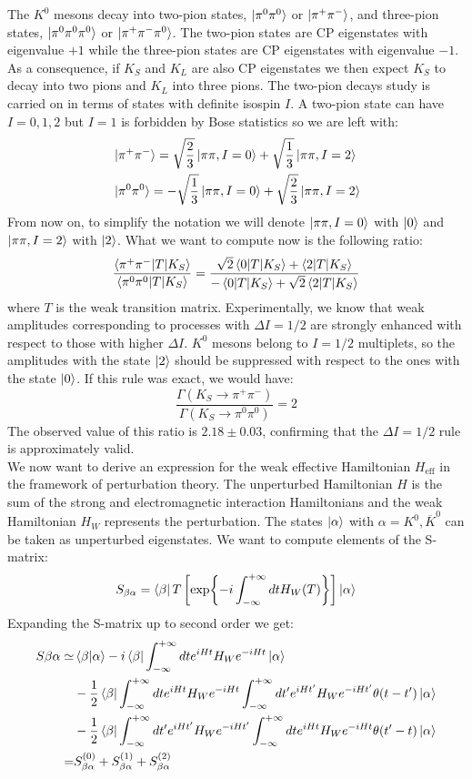 \documentclass[../main.tex]{subfiles}
\begin{document}
The $K^0$ mesons decay into two-pion states, $\ket{\pi^0\pi^0}$ or $\ket{\pi^+\pi^-}$, and three-pion states, $\ket{\pi^0\pi^0\pi^0}$ or $\ket{\pi^+\pi^-\pi^0}$. The two-pion states are CP eigenstates with eigenvalue $+1$ while the three-pion states are CP eigenstates with eigenvalue $-1$. As a consequence, if $K_S$ and $K_L$ are also CP eigenstates we then expect $K_S$ to decay into two pions and $K_L$ into three pions. The two-pion decays study is carried on in terms of states with definite isospin $I$. A two-pion state can have $I=0,1,2$  but $I=1$ is forbidden by Bose statistics so we are left with:
\[
\begin{aligned}
&\ket{\pi^+\pi^-}=\sqrt{\frac{2}{3}}\ket{\pi\pi,I=0}+\sqrt{\frac{1}{3}}\ket{\pi\pi,I=2}\\
&\ket{\pi^0\pi^0}=-\sqrt{\frac{1}{3}}\ket{\pi\pi,I=0}+\sqrt{\frac{2}{3}}\ket{\pi\pi,I=2}
\end{aligned}
\]
From now on, to simplify the notation we will denote $\ket{\pi\pi,I=0}$ with $\ket{0}$ and $\ket{\pi\pi,I=2}$ with $\ket{2}$. What we want to compute now is the following ratio:
\[
\frac{\braket{\pi^+\pi^-|T|K_S}}{\braket{\pi^0\pi^0|T|K_S}}=\frac{\sqrt{2}\braket{0|T|K_S}+\braket{2|T|K_S}}{-\braket{0|T|K_S}+\sqrt{2}\braket{2|T|K_S}}
\]
where $T$ is the weak transition matrix. Experimentally, we know that weak amplitudes corresponding to processes with $\Delta I=1/2$ are strongly enhanced with respect to those with higher $\Delta I$. $K^0$ mesons belong to $I=1/2$ multiplets, so the amplitudes with the state $\ket{2}$ should be suppressed with respect to the ones with the state $\ket{0}$. If this rule was exact, we would have:
\[
\frac{\Gamma(K_S\to\pi^+\pi^-)}{\Gamma(K_S\to\pi^0\pi^0)}=2
\]
The observed value of this ratio is $2.18\pm0.03$, confirming that the $\Delta I=1/2$ rule is approximately valid.\\ 
We now want to derive an expression for the weak effective Hamiltonian $H_{\text{eff}}$ in the framework of perturbation theory. The unperturbed Hamiltonian $H$ is the sum of the strong and electromagnetic interaction Hamiltonians and the weak Hamiltonian $H_W$ represents the perturbation. The states $\ket{\alpha}$ with $\alpha=K^0,\overline{K}^0$ can be taken as unperturbed eigenstates. We want to compute elements of the S-matrix:
\[
S_{\beta\alpha}=\bra{\beta}T\left[\exp{-i\int_{-\infty}^{+\infty}dtH_W(T)}\right]\ket{\alpha}
\]
Expanding the S-matrix up to second order we get:
\begin{align*}
S{\beta\alpha}\simeq&\braket{\beta|\alpha}-i\bra{\beta}\int_{-\infty}^{+\infty}dte^{iHt}H_We^{-iHt}\ket{\alpha}\\
&-\frac{1}{2}\bra{\beta}\int_{-\infty}^{+\infty}dte^{iHt}H_We^{-iHt}\int_{-\infty}^{+\infty}dt'e^{iHt'}H_We^{-iHt'}\theta(t-t')\ket{\alpha}\\
&-\frac{1}{2}\bra{\beta}\int_{-\infty}^{+\infty}dt'e^{iHt'}H_We^{-iHt'}\int_{-\infty}^{+\infty}dte^{iHt}H_We^{-iHt}\theta(t'-t)\ket{\alpha}\\
=&S_{\beta\alpha}^{(0)}+S_{\beta\alpha}^{(1)}+S_{\beta\alpha}^{(2)}
\end{align*}
\end{document}

